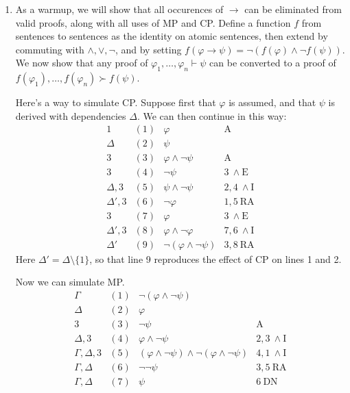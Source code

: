 \documentclass[12pt,fleqn]{article}
\begin{document}
\begin{enumerate}
\item As a warmup, we will show that all occurences of $\to$ can be
  eliminated from valid proofs, along with all uses of MP and
  CP. Define a function $f$ from sentences to sentences as the
  identity on atomic sentences, then extend by commuting with
  $\wedge ,\vee ,\neg$, and by setting
  $f(\varphi\to\psi )=\neg (f(\varphi )\wedge \neg f(\psi ))$. We now
  show that any proof of $\varphi _1,\dots ,\varphi _n\vdash \psi$ can
  be converted to a proof of
  $f(\varphi _1),\dots ,f(\varphi _n)\succ f(\psi )$.

  Here's a way to simulate CP. Suppose first that $\varphi$ is
  assumed, and that $\psi$ is derived with dependencies $\Delta$. We
  can then continue in this way:
  \noindent \[ \begin{array}{r|c|l|l}
1          & (1) & \varphi                      & \text{A} \\[2pt]
              \Delta     & (2) & \psi \\[6pt]
3          & (3) & \varphi \land \neg\psi       & \text{A} \\[2pt]
3          & (4) & \neg\psi                     & 3\ \land\text{E} \\[2pt]
\Delta,3   & (5) & \psi \land \neg\psi          & 2,4\ \land\text{I} \\[2pt]
\Delta',3  & (6) & \neg\varphi                  & 1,5\ \text{RA} \\[2pt]
3          & (7) & \varphi                      & 3\ \land\text{E} \\[2pt]
\Delta',3  & (8) & \varphi \land \neg\varphi    & 7,6\ \land\text{I} \\[2pt]
\Delta'    & (9) & \neg(\varphi \land \neg\psi) & 3,8\ \text{RA}
\end{array}
\]
Here $\Delta '=\Delta\setminus\{1\}$, so that line 9 reproduces the
effect of CP on lines 1 and 2.

Now we can simulate MP.
\noindent \[ \begin{array}{r|c|l|l}
               \Gamma     & (1) & \neg (\varphi\wedge \neg\psi) &  \\[2pt]
               \Delta     & (2) & \varphi \\[6pt]
               3          & (3) & \neg\psi                     & \text{A} \\[2pt]
               \Delta, 3  & (4) & \varphi\wedge\neg\psi        & 2,3\ \land\text{I} \\[2pt]
       \Gamma ,\Delta ,3  & (5) & (\varphi\wedge\neg\psi )\wedge\neg (\varphi\wedge\neg\psi)  & 4,1\ \land\text{I} \\[2pt]
       \Gamma ,\Delta     & (6) & \neg\neg\psi                  & 3,5\ \text{RA} \\[2pt]
        \Gamma ,\Delta    & (7) & \psi                          & 6\                                                                   \text{DN} \end{array}
\]
            

\end{enumerate}
\end{document}
